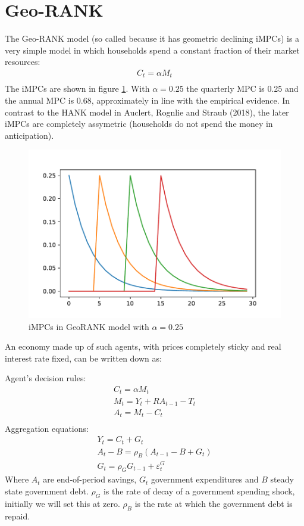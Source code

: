\documentclass{article}
\begin{document}
\section{Geo-RANK}
The Geo-RANK model (so called because it has geometric declining iMPCs) is a very simple model in which households spend a constant fraction of their market resources:
\begin{align*}
C_t = \alpha M_t \\
\end{align*}
The iMPCs are shown in figure \ref{fig:iMPC_RANK}. With $\alpha=0.25$ the quarterly MPC is 0.25 and the annual MPC is 0.68, approximately in line with the empirical evidence. In contrast to the HANK model in Auclert, Rognlie and Straub (2018), the later iMPCs are completely assymetric (households do not spend the money in anticipation).
\begin{figure} 
	\begin{centering}
		\includegraphics[scale=0.7]{../../Python/DoloCode/GeoTANK/Figures/iMPC_RANK.pdf}
		\caption{iMPCs in GeoRANK model with $\alpha=0.25$}
		\label{fig:iMPC_RANK}
	\end{centering}
\end{figure}
An economy made up of such agents, with prices completely sticky and real interest rate fixed, can be written down as:

Agent's decision rules:
\begin{align*}
C_t = \alpha M_t \\
M_t = Y_t + R A_{t-1} -T_t \\
A_t = M_t - C_t \\
\end{align*}
Aggregation equations:
\begin{align*}
Y_t = C_t + G_t \\
A_t - B =   \rho_B(A_{t-1} - B + G_t ) \\
G_t = \rho_G G_{t-1} + \varepsilon^G_t
\end{align*}
Where $A_t$ are end-of-period savings, $G_t$ government expenditures and $B$ steady state government debt. $\rho_G$ is the rate of decay of a government spending shock, initially we will set this at zero. $\rho_B$ is the rate at which the government debt is repaid.
\end{document}

